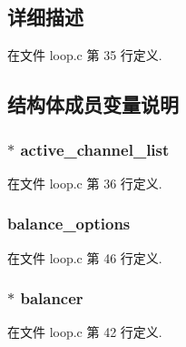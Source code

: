 \subsection{详细描述}


在文件 loop.\+c 第 35 行定义.



\subsection{结构体成员变量说明}
\hypertarget{struct__loop__t_a66deffb2eaaf50c8a6b832feeecd39e1}{}
\subsubsection[{active\+\_\+channel\+\_\+list}]{$\ast$ active\+\_\+channel\+\_\+list}\label{struct__loop__t_a66deffb2eaaf50c8a6b832feeecd39e1}


在文件 loop.\+c 第 36 行定义.

\hypertarget{struct__loop__t_a5abc8854de864ba27aed98db787118da}{}
\subsubsection[{balance\+\_\+options}]{ balance\+\_\+options}\label{struct__loop__t_a5abc8854de864ba27aed98db787118da}


在文件 loop.\+c 第 46 行定义.

\hypertarget{struct__loop__t_aa2d38510cd70c4c599ab41e3f715b9a5}{}
\subsubsection[{balancer}]{$\ast$ balancer}\label{struct__loop__t_aa2d38510cd70c4c599ab41e3f715b9a5}


在文件 loop.\+c 第 42 行定义.

